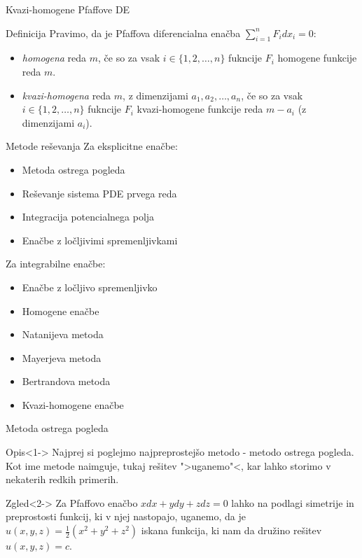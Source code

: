 \documentclass[t, 8pt]{beamer} %
\newcommand{\pojem}[1]{\emph{#1}}
\newcommand{\fillblack}[1]{
	\begin{tikzpicture}[remember picture, overlay]
		\node [shift={(0 cm,0cm)}]  at (current page.south west)
		{%
			\begin{tikzpicture}[remember picture, overlay] at (current page.south west)
				\draw [fill=black] (0, 0) -- (0,#1 \paperheight) --
				(\paperwidth,#1 \paperheight) -- (\paperwidth,0) -- cycle ;
			\end{tikzpicture}
		};
		\draw (current page.north west) rectangle (current page.south east);
	\end{tikzpicture}
}
\begin{document}
		\begin{frame}{Kvazi-homogene Pfaffove DE}
			\begin{block}{Definicija}
				Pravimo, da je Pfaffova diferencialna enačba $\sum_{i = 1}^n F_i dx_i = 0$:\begin{itemize}
					\item \pojem{homogena} reda $m$, če so za vsak $i\in\{1, 2, \ldots, n\}$ fukncije $F_i$ homogene funkcije reda $m$.
					\item \pojem{kvazi-homogena} reda $m$, z dimenzijami $a_1, a_2, \ldots, a_n$, če so za vsak $i\in\{1, 2, \ldots, n\}$ fukncije $F_i$ kvazi-homogene funkcije reda $m - a_i$ (z dimenzijami $a_i$).
				\end{itemize} 
			\end{block}
		\end{frame}
		
		\begin{frame}{Metode reševanja}
			Za eksplicitne enačbe:\begin{itemize}
				\item Metoda ostrega pogleda
				\item Reševanje sistema PDE prvega reda
				\item Integracija potencialnega polja
				\item Enačbe z ločljivimi spremenljivkami
			\end{itemize}
			
			Za integrabilne enačbe:\begin{itemize}
				\item Enačbe z ločljivo spremenljivko
				\item Homogene enačbe
				\item Natanijeva metoda
				\item Mayerjeva metoda
				\item Bertrandova metoda
				\item Kvazi-homogene enačbe
			\end{itemize}
		\end{frame}
		
		\begin{frame}{Metoda ostrega pogleda}
			\begin{block}{Opis}<1->
					Najprej si poglejmo najpreprostejšo metodo - metodo ostrega pogleda. Kot ime metode naimguje, tukaj rešitev ">uganemo"<, kar lahko storimo v nekaterih redkih primerih. 
			\end{block}
			\begin{block}{Zgled}<2->
					Za Pfaffovo enačbo $xdx + ydy + zdz = 0$ lahko na podlagi simetrije in preprostosti funkcij, ki v njej nastopajo, uganemo, da je $u(x, y, z) = \frac{1}{2}(x^2 + y^2 + z^2)$ iskana funkcija, ki nam da družino rešitev $u(x, y, z) = c$.
			\end{block}
		\end{frame}
		
\end{document}
